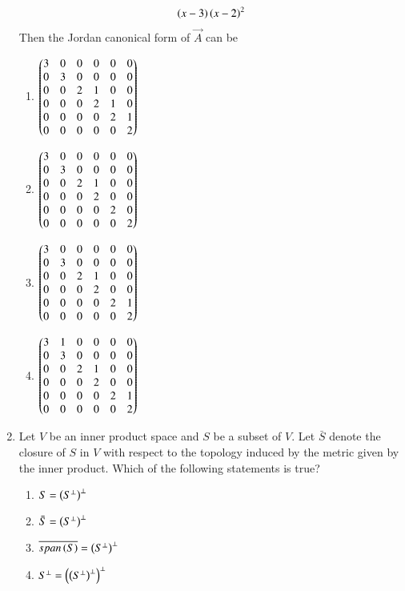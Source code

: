 \begin{enumerate}[label=\thesection.\arabic*.,ref=\thesection.\theenumi]
\begin{align}
\left(x-3\right)
\left(x-2\right)^2
\end{align}
%
Then the Jordan canonical form of $\vec{A}$ can be
\begin{enumerate}
\item  
$
\begin{pmatrix}
3 & 0 & 0 & 0 & 0 & 0 
\\
0 & 3 & 0 & 0 & 0 & 0 
\\
0 & 0 & 2 & 1 & 0 & 0 
\\
0 & 0 & 0 & 2 & 1 & 0 
\\
0 & 0 & 0 & 0 & 2 & 1 
\\
0 & 0 & 0 & 0 & 0 & 2
\end{pmatrix}
$ 
\item  
$
\begin{pmatrix}
3 & 0 & 0 & 0 & 0 & 0 
\\
0 & 3 & 0 & 0 & 0 & 0 
\\
0 & 0 & 2 & 1 & 0 & 0 
\\
0 & 0 & 0 & 2 & 0 & 0 
\\
0 & 0 & 0 & 0 & 2 & 0 
\\
0 & 0 & 0 & 0 & 0 & 2
\end{pmatrix}
$ 
\item  
$
\begin{pmatrix}
3 & 0 & 0 & 0 & 0 & 0 
\\
0 & 3 & 0 & 0 & 0 & 0 
\\
0 & 0 & 2 & 1 & 0 & 0 
\\
0 & 0 & 0 & 2 & 0 & 0 
\\
0 & 0 & 0 & 0 & 2 & 1 
\\
0 & 0 & 0 & 0 & 0 & 2
\end{pmatrix}
$ 
\item  
$
\begin{pmatrix}
3 & 1 & 0 & 0 & 0 & 0 
\\
0 & 3 & 0 & 0 & 0 & 0 
\\
0 & 0 & 2 & 1 & 0 & 0 
\\
0 & 0 & 0 & 2 & 0 & 0 
\\
0 & 0 & 0 & 0 & 2 & 1 
\\
0 & 0 & 0 & 0 & 0 & 2
\end{pmatrix}
$ 
\end{enumerate}
\item Let $V$ be an inner product space and $S$ be a
subset of $V$.  Let $\bar{S}$ denote the closure of $S$
in $V$ with respect to the topology induced by the metric
given by the inner product.  Which of the following statements is true?
\begin{enumerate}
\item $S = \left(S^{\perp}\right)^{\perp}$
\item $\bar{S} = \left(S^{\perp}\right)^{\perp}$
\item $\overline{span\left(S\right)} = \left(S^{\perp}\right)^{\perp}$
\item $S^{\perp} = \left(\left(S^{\perp}\right)^{\perp}\right)^{\perp}$

\end{enumerate}
\end{enumerate}
